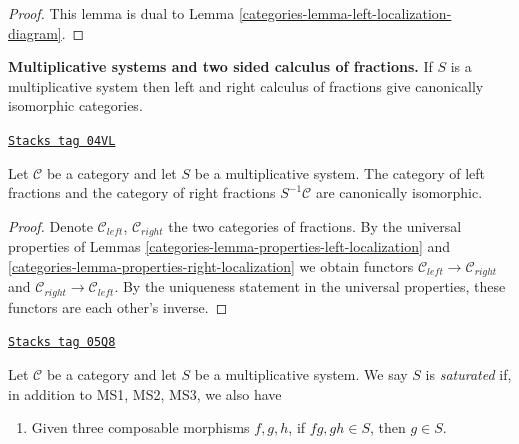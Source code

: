 \begin{proof}

This lemma is dual to
Lemma \ref{categories-lemma-left-localization-diagram}.
\end{proof}

{\bf Multiplicative systems and two sided calculus of fractions.}
If $S$ is a multiplicative system then left and right calculus of
fractions give canonically isomorphic categories.

\begin{lemma}
\label{categories-lemma-multiplicative-system}
\href{https://stacks.math.columbia.edu/tag/04VL}{\texttt{Stacks tag 04VL}}

Let $\mathcal{C}$ be a category and let $S$ be a multiplicative system.
The category of left fractions and the category of right fractions
$S^{-1}\mathcal{C}$ are canonically isomorphic.
\end{lemma}

\begin{proof}

Denote $\mathcal{C}_{left}$, $\mathcal{C}_{right}$ the two categories
of fractions. By the universal properties of
Lemmas \ref{categories-lemma-properties-left-localization} and
\ref{categories-lemma-properties-right-localization}
we obtain functors $\mathcal{C}_{left} \to \mathcal{C}_{right}$
and $\mathcal{C}_{right} \to \mathcal{C}_{left}$.
By the uniqueness statement in the universal properties, these
functors are each other's inverse.
\end{proof}

\begin{definition}
\label{categories-definition-saturated-multiplicative-system}
\href{https://stacks.math.columbia.edu/tag/05Q8}{\texttt{Stacks tag 05Q8}}

Let $\mathcal{C}$ be a category and let $S$ be a multiplicative system.
We say $S$ is {\it saturated} if, in addition to MS1, MS2, MS3, we
also have
\begin{enumerate}
\item[MS4] Given three composable morphisms $f, g, h$, if
$fg, gh \in S$, then $g \in S$.
\end{enumerate}
\end{definition}

